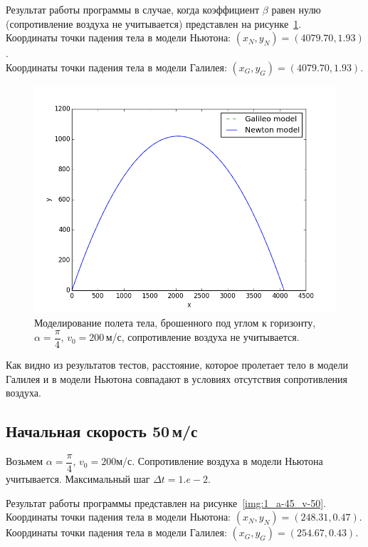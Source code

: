 \documentclass[14pt,russian]{extarticle}
\begin{document}
Результат работы программы в случае, когда коэффициент $\beta$ равен нулю (сопротивление воздуха не учитывается) представлен на рисунке~\ref{img:2_a-45_v-200}.\\
Координаты точки падения тела в модели Ньютона: $(x_N, y_N) = (4079.70, 1.93)$. \\
Координаты точки падения тела в модели Галилея: $(x_G, y_G) = (4079.70, 1.93)$.
\begin{figure}[h!]
	\centering
		\includegraphics[width=1\linewidth]{img/2_a-45_v-200.png}
	\caption{Моделирование полета тела, брошенного под углом к горизонту, $\alpha = \dfrac{\pi}{4}$, $v_0 = 200\,$м/с, сопротивление воздуха не учитывается.}
	\label{img:2_a-45_v-200}
\end{figure}

Как видно из результатов тестов, расстояние, которое пролетает тело в модели Галилея и в модели Ньютона совпадают в условиях отсутствия сопротивления воздуха.

\subsection{Начальная скорость 50\,м/с}
Возьмем $\alpha = \dfrac{\pi}{4}$, $v_0 = 200$м/с. Сопротивление воздуха в модели Ньютона учитывается. Максимальный шаг $\Delta t=1.e-2$.

Результат работы программы представлен на рисунке~\ref{img:1_a-45_v-50}.\\
Координаты точки падения тела в модели Ньютона: $(x_N, y_N) = (248.31, 0.47)$. \\
Координаты точки падения тела в модели Галилея: $(x_G, y_G) = (254.67, 0.43)$.
\end{document}
